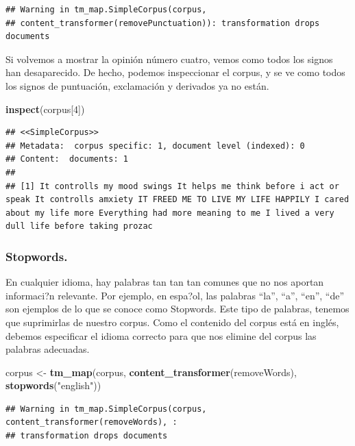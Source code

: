 \documentclass[spanish,]{article}
\newenvironment{Shaded}{\begin{snugshade}}{\end{snugshade}}
\newcommand{\KeywordTok}[1]{\textcolor[rgb]{0.13,0.29,0.53}{\textbf{#1}}}
\newcommand{\DecValTok}[1]{\textcolor[rgb]{0.00,0.00,0.81}{#1}}
\newcommand{\StringTok}[1]{\textcolor[rgb]{0.31,0.60,0.02}{#1}}
\newcommand{\NormalTok}[1]{#1}
\begin{document}
\begin{verbatim}
## Warning in tm_map.SimpleCorpus(corpus,
## content_transformer(removePunctuation)): transformation drops documents
\end{verbatim}

Si volvemos a mostrar la opinión número cuatro, vemos como todos los
signos han desaparecido. De hecho, podemos inspeccionar el corpus, y se
ve como todos los signos de puntuación, exclamación y derivados ya no
están.

\begin{Shaded}
\begin{Highlighting}[]
\KeywordTok{inspect}\NormalTok{(corpus[}\DecValTok{4}\NormalTok{])}
\end{Highlighting}
\end{Shaded}

\begin{verbatim}
## <<SimpleCorpus>>
## Metadata:  corpus specific: 1, document level (indexed): 0
## Content:  documents: 1
## 
## [1] It controlls my mood swings It helps me think before i act or speak It controlls amxiety IT FREED ME TO LIVE MY LIFE HAPPILY I cared about my life more Everything had more meaning to me I lived a very dull life before taking prozac
\end{verbatim}

\subsubsection{Stopwords.}\label{stopwords.}

En cualquier idioma, hay palabras tan tan tan comunes que no nos aportan
informaci?n relevante. Por ejemplo, en espa?ol, las palabras ``la'',
``a'', ``en'', ``de'' son ejemplos de lo que se conoce como Stopwords.
Este tipo de palabras, tenemos que suprimirlas de nuestro corpus. Como
el contenido del corpus está en inglés, debemos especificar el idioma
correcto para que nos elimine del corpus las palabras adecuadas.

\begin{Shaded}
\begin{Highlighting}[]
\NormalTok{corpus <-}\StringTok{ }\KeywordTok{tm_map}\NormalTok{(corpus, }\KeywordTok{content_transformer}\NormalTok{(removeWords), }
          \KeywordTok{stopwords}\NormalTok{(}\StringTok{"english"}\NormalTok{))}
\end{Highlighting}
\end{Shaded}

\begin{verbatim}
## Warning in tm_map.SimpleCorpus(corpus, content_transformer(removeWords), :
## transformation drops documents
\end{verbatim}
\end{document}
